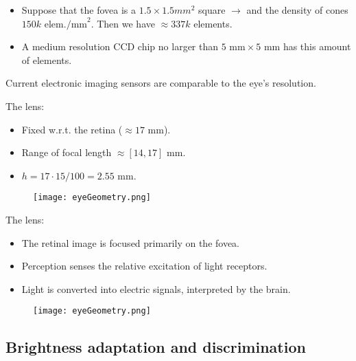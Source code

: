 \begin{frame}
\begin{itemize}
\item Suppose that the fovea is a $1.5\times 1.5 mm^{2}$ square $\rightarrow$ and the density of cones $150k\text{ elem./mm}^{2}$. Then we have $\approx 337k$ elements.
\item A medium resolution CCD chip no larger than $5\text{ mm}\times\text{5 mm}$ has this amount of elements.
\end{itemize}
\begin{block}{}
Current electronic imaging sensors are comparable to the eye's resolution.
\end{block}
\end{frame}


\begin{frame}
The lens:
\begin{itemize}
\item Fixed w.r.t. the retina ($\approx 17\text{ mm}$).
\item Range of focal length $\approx [14,17]$ mm.
\item $h=17\cdot 15/100	= 2.55$ mm.
\end{itemize}
\begin{figure}
\texttt{[image: eyeGeometry.png]}
\end{figure}
\end{frame}

\begin{frame}
The lens:
\begin{itemize}
\item The retinal image is focused primarily on the fovea.
\item Perception senses the relative excitation of light receptors.
\item Light is converted into electric signals, interpreted by the brain.
\end{itemize}
\begin{figure}
\texttt{[image: eyeGeometry.png]}
\end{figure}
\end{frame}


\subsection{Brightness adaptation and discrimination}

